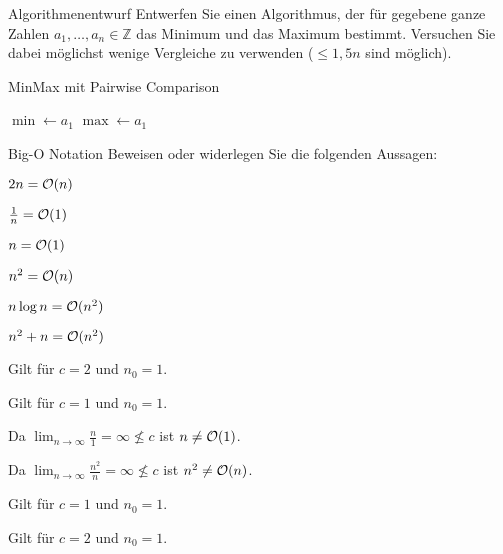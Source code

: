 \documentclass{exercisesheet}
\begin{document}
\begin{exercise}{Algorithmenentwurf}
  Entwerfen Sie einen Algorithmus, der für gegebene ganze Zahlen $a_1, \ldots, a_n \in \mathbb{Z}$ das Minimum und das Maximum bestimmt. Versuchen Sie dabei möglichst wenige Vergleiche zu verwenden ($\leq 1,5n$ sind möglich).

  \begin{solution}
    \begin{algorithm}[ht]
      \caption{MinMax mit Pairwise Comparison}

      $\min \gets a_1$
      $\max \gets a_1$

    \end{algorithm}
  \end{solution}
\end{exercise}



\begin{eexercises}{Big-O Notation}{
    Beweisen oder widerlegen Sie die folgenden Aussagen:}
  \item $2n = \mathcal{O}(n)$
  \item $\frac{1}{n} = \mathcal{O}(1)$
  \item $n = \mathcal{O}(1)$
  \item $n^2 = \mathcal{O}(n)$
  \item $n \log n = \mathcal{O}(n^2)$
  \item $n^2 + n = \mathcal{O}(n^2)$
\end{eexercises}

\begin{solutions}
  \item Gilt für $c = 2$ und $n_0 = 1$.
  \item Gilt für $c = 1$ und $n_0 = 1$.
  \item Da $\lim_{n\to\infty} \frac{n}{1} = \infty \not\le c$ ist $n \neq \mathcal{O}(1)$.
  \item Da $\lim_{n\to\infty} \frac{n^2}{n} = \infty \not\le c$ ist $n^2 \neq \mathcal{O}(n)$.
  \item Gilt für $c = 1$ und $n_0 = 1$.
  \item Gilt für $c = 2$ und $n_0 = 1$.
\end{solutions}
\end{document}
